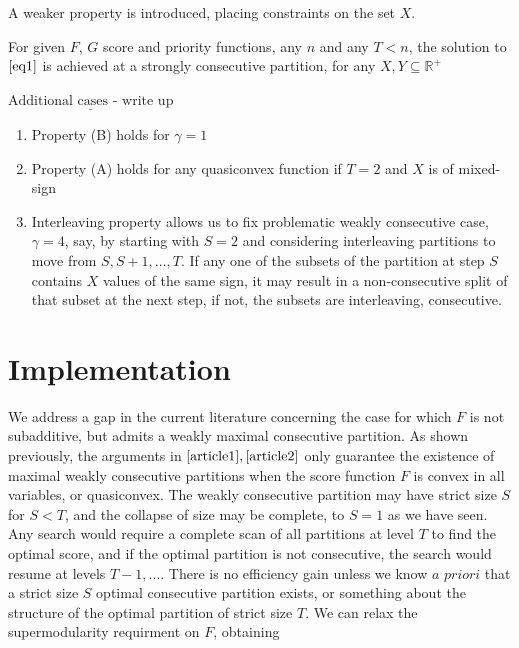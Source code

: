 \documentclass{article}
\theoremstyle{case}
\begin{document}
A weaker property is introduced, placing constraints on the set $X$.
\vspace{8pt}

\begin{addmargin}[2em]{2em} \label{propA}
\begin{list}{(B)}{}
\item For given $F$, $G$ score and priority functions, any $n$ and any $T < n$, the solution to $\ref{eq1}$ is achieved at a strongly consecutive partition, for any $X, Y \subseteq \mathbb{R}^+$
\end{list}
\end{addmargin}
\vspace{8pt}

\vspace{16pt}

$\underline{\text{Additional cases - write up}}$
\begin{enumerate}
    \item Property (B) holds for $\gamma = 1$
    \item Property (A) holds for any quasiconvex function if $T = 2$ and $X$ is of mixed-sign
    \item Interleaving property allows us to fix problematic weakly consecutive case, $\gamma = 4$, say, by starting with $S = 2$ and considering interleaving partitions to move from $S, S+1, \dots, T$. If any one of the subsets of the partition at step $S$ contains $X$ values of the same sign, it may result in a non-consecutive split of that subset at the next step, if not, the subsets are interleaving, consecutive.
\end{enumerate}

\section{Implementation}
We address a gap in the current literature concerning the case for which $F$ is not subadditive, but admits a weakly maximal consecutive partition. As shown previously, the arguments in $\cite{article1}, \cite{article2}$ only guarantee the existence of maximal weakly consecutive partitions when the score function $F$ is convex in all variables, or quasiconvex. The weakly consecutive partition may have strict size $S$ for $S < T$, and the collapse of size may be complete, to $S = 1$ as we have seen. Any search would require a complete scan of all partitions at level $T$ to find the optimal score, and if the optimal partition is not consecutive, the search would resume at levels $T-1, ...$. There is no efficiency gain unless we know $\textit{a priori}$ that a strict size $S$ optimal consecutive partition exists, or something about the structure of the optimal partition of strict size $T$. We can relax the supermodularity requirment on $F$, obtaining
\end{document}
